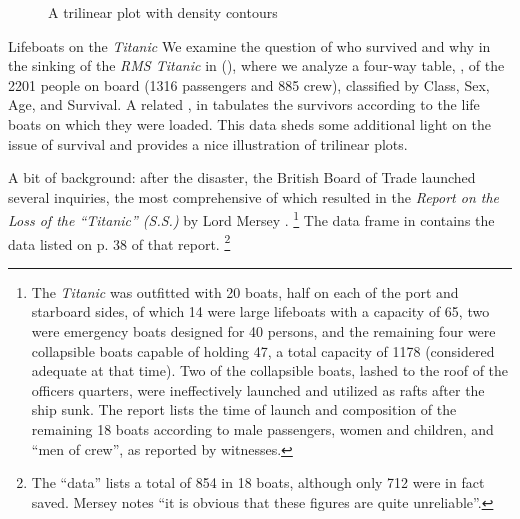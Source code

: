 \documentclass[10pt,krantz2]{krantz}\usepackage[]{graphicx}\usepackage[]{color}
\newenvironment{knitrout}{}{} %
\renewenvironment{knitrout}{\small\renewcommand{\baselinestretch}{.85}}{} %
\begin{document}
\begin{knitrout}
\begin{figure}[!htbp]
\caption[A trilinear plot with density contours]{A trilinear plot with density contours\label{fig:ggterm-demo}}
\end{figure}


\end{knitrout}

\begin{Example}[lifeboat1]{Lifeboats on the \emph{Titanic}}
We examine the question of who survived and why in the sinking of the \emph{RMS Titanic} in  (),
where we analyze a four-way table, ,
of the 2201 people on board (1316 passengers and 885 crew),
classified by Class, Sex, Age, and Survival.
A related \Dset,  in  tabulates
the survivors according to the life boats on which they were loaded.
This data sheds some additional light on the issue of survival and
provides a nice illustration of trilinear plots.

A bit of background: after the disaster, the British Board of Trade launched several
inquiries, the most comprehensive of which resulted in the
\emph{Report on the Loss of the ``Titanic'' (S.S.)}
by Lord Mersey
\citep{Mersey:1912}.
\footnote{
The \emph{Titanic} was outfitted with 20 boats, half on each of the
port and starboard sides,
 of which 14 were large
lifeboats with a capacity of 65, two were emergency boats designed for
40 persons, and the remaining four were collapsible boats capable of holding
47, a total capacity of 1178 (considered adequate at that time).
Two of the collapsible boats, lashed to the roof of the officers
quarters, were ineffectively launched and utilized as rafts after the ship sunk.
The report lists the time of launch and composition of the remaining 18 boats according to male passengers, women and children, and ``men of crew'',
as reported by witnesses.
}
The  data frame   in 
contains the data listed on p. 38 of that report.%
\footnote{The ``data'' lists a total of 854 in 18 boats, although only
712 were in fact saved.  Mersey notes ``it is obvious that these figures
are quite unreliable''.
}


\end{Example}
\end{document}
